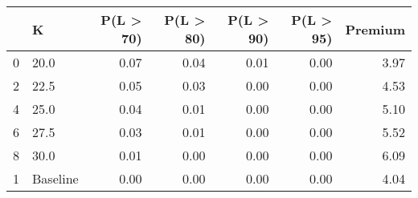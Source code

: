 \begin{tabular}{llrrrrr}
\toprule
{} &         K &  P(L > 70) &  P(L > 80) &  P(L > 90) &  P(L > 95) &  Premium \\
\midrule
0 &      20.0 &       0.07 &       0.04 &       0.01 &       0.00 &     3.97 \\
2 &      22.5 &       0.05 &       0.03 &       0.00 &       0.00 &     4.53 \\
4 &      25.0 &       0.04 &       0.01 &       0.00 &       0.00 &     5.10 \\
6 &      27.5 &       0.03 &       0.01 &       0.00 &       0.00 &     5.52 \\
8 &      30.0 &       0.01 &       0.00 &       0.00 &       0.00 &     6.09 \\
1 &  Baseline &       0.00 &       0.00 &       0.00 &       0.00 &     4.04 \\
\bottomrule
\end{tabular}
